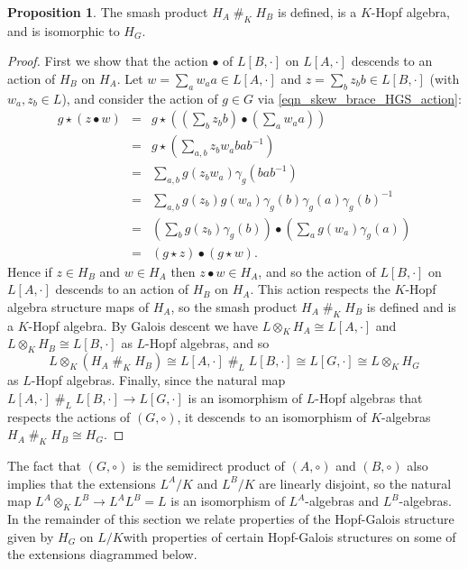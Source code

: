 \documentclass[12pt,a4paper, reqno]{amsart}
\theoremstyle{definition}
\newtheorem{proposition}[theorem]{Proposition}
\begin{document}
\begin{proposition} \label{prop_H_G_smash_product}
The smash product $ H_{A} \; \#_{K} \; H_{B} $ is defined, is a $ K $-Hopf algebra, and is isomorphic to $ H_{G} $. 
\end{proposition}
\begin{proof}
First we show that the action $ \bullet $ of $ L[B,\cdot] $ on $ L[A,\cdot] $  descends to an action of $ H_{B} $ on $ H_{A} $. Let $ w= \sum_{a} w_{a} a \in L[A,\cdot] $ and $ z = \sum_{b} z_{b} b \in L[B,\cdot] $ (with $ w_{a},z_{b} \in L $), and consider the action of $ g \in G $ via \eqref{eqn_skew_brace_HGS_action}:
\begin{eqnarray*}
g \star ( z \bullet w ) & = & g \star \left( \left(\sum_{b} z_{b} b \right) \bullet \left( \sum_{a} w_{a} a \right) \right) \\
& = & g \star \left( \sum_{a,b} z_{b} w_{a} bab^{-1} \right) \\
& = & \sum_{a,b} g(z_{b} w_{a}) \gamma_{g}(bab^{-1}) \\
& = & \sum_{a,b} g(z_{b}) g(w_{a}) \gamma_{g}(b)\gamma_{g}(a)\gamma_{g}(b)^{-1} \\ 
& = & \left(\sum_{b} g(z_{b}) \gamma_{g}(b) \right) \bullet \left( \sum_{a} g(w_{a}) \gamma_{g}(a) \right) \\
& = & (g \star z) \bullet (g \star w).
\end{eqnarray*}
Hence if $ z \in H_{B} $ and $ w \in H_{A} $ then $ z \bullet w \in H_{A} $, and so the action of $ L[B,\cdot] $ on $ L[A,\cdot] $ descends to an action of $ H_{B} $ on $ H_{A} $. This action respects the $ K $-Hopf algebra structure maps of $ H_{A} $, so the smash product $ H_{A} \; \#_{K} \; H_{B} $ is defined and is a $ K $-Hopf algebra. By Galois descent we have $ L \otimes_{K} H_{A} \cong L[A,\cdot] $ and $ L \otimes_{K} H_{B} \cong L[B,\cdot] $ as $ L $-Hopf algebras, and so
\[ L \otimes_{K} (H_{A} \; \#_{K} \; H_{B}) \cong L[A,\cdot] \; \#_{L} \; L[B,\cdot] \cong L[G,\cdot] \cong L \otimes_{K} H_{G} \]
as $ L $-Hopf algebras. Finally, since the natural map $ L[A,\cdot] \; \#_{L} \; L[B,\cdot] \rightarrow L[G,\cdot] $ is an isomorphism of $ L $-Hopf algebras that respects the actions of $ (G,\circ) $, it descends to an isomorphism of $ K $-algebras $ H_{A} \; \#_{K} \; H_{B} \cong H_{G} $. 
\end{proof}

The fact that $ (G,\circ) $ is the semidirect product of $ (A,\circ) $ and $ (B,\circ) $ also implies that the extensions $ L^{A}/K $ and $ L^{B}/K $ are linearly disjoint, so the natural map $ L^{A} \otimes_{K} L^{B} \rightarrow L^{A}L^{B} = L $ is an isomorphism of $ L^{A} $-algebras and $ L^{B} $-algebras. In the remainder of this section we relate properties of the Hopf-Galois structure given by $ H_{G} $ on $ L/K $with properties of certain Hopf-Galois structures on some of the extensions diagrammed below. 
\end{document}
